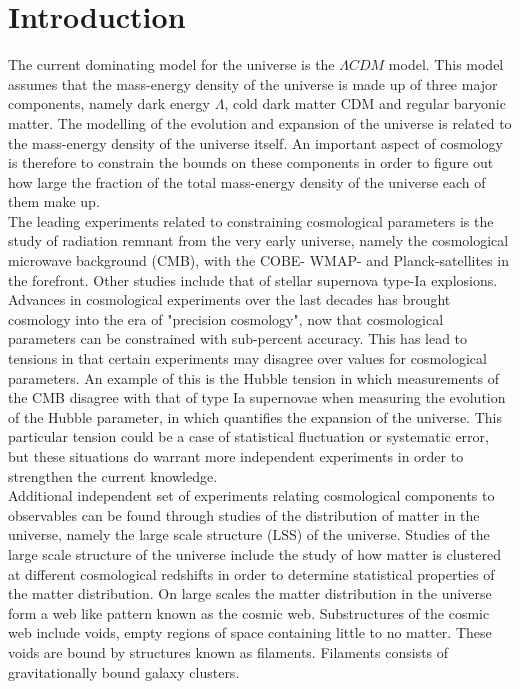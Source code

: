 \chapter{Introduction}
The current dominating model for the universe is the $\Lambda CDM$ model. This model assumes that the mass-energy density of the universe is made up of three major components, namely dark energy $\Lambda$, cold dark matter CDM and regular baryonic matter. The modelling of the evolution and expansion of the universe is related to the mass-energy density of the universe itself. An important aspect of cosmology is therefore to constrain the bounds on these components in order to figure out how large the fraction of the total mass-energy density of the universe each of them make up.\\\indent
The leading experiments related to constraining cosmological parameters is the study of radiation remnant from the very early universe, namely the cosmological microwave background (CMB)\cite{1965cmb}, with the COBE-\cite{Smoot_1999} WMAP-\cite{Wmap} and Planck-satellites\cite{planckvi} in the forefront. Other studies include that of stellar supernova type-Ia explosions\cite{Pantheon}. Advances in cosmological experiments over the last decades has brought cosmology into the era of "precision cosmology", now that cosmological parameters can be constrained with sub-percent accuracy. This has lead to tensions in that certain experiments may disagree over values for cosmological parameters. An example of this is the Hubble tension in which measurements of the CMB disagree with that of type Ia supernovae when measuring the evolution of the Hubble parameter, in which quantifies the expansion of the universe. This particular tension could be a case of statistical fluctuation or systematic error, but these situations do warrant more independent experiments in order to strengthen the current knowledge.\\\indent Additional independent set of experiments relating cosmological components to observables can be found through studies of the distribution of matter in the universe, namely the large scale structure (LSS) of the universe. Studies of the large scale structure of the universe include the study of how matter is clustered at different cosmological redshifts in order to determine statistical properties of the matter distribution. On large scales the matter distribution in the universe form a web like pattern known as the cosmic web\cite{bondweb}. Substructures of the cosmic web include voids, empty regions of space containing little to no matter. These voids are bound by structures known as filaments. Filaments consists of gravitationally bound galaxy clusters. \\\indent
